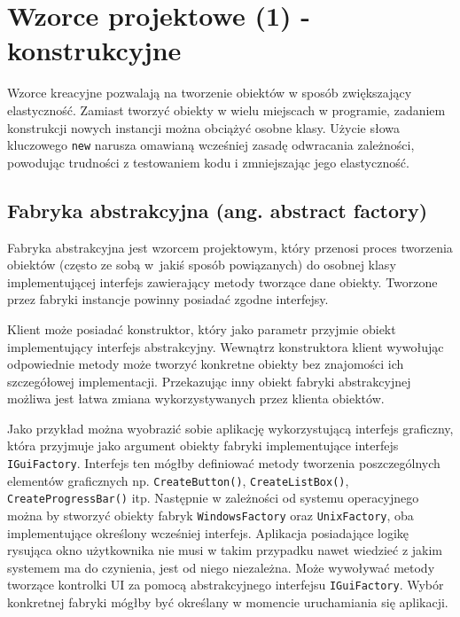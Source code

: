 \section{Wzorce projektowe (1) - konstrukcyjne}
Wzorce kreacyjne pozwalają na tworzenie obiektów w sposób zwiększający elastyczność. Zamiast tworzyć obiekty w wielu miejscach w programie, zadaniem konstrukcji nowych instancji można obciążyć osobne klasy. Użycie słowa kluczowego \texttt{new} narusza omawianą wcześniej zasadę odwracania zależności, powodując trudności z testowaniem kodu i zmniejszając jego elastyczność. 

\subsection{Fabryka abstrakcyjna (ang. abstract factory)}\label{sec/lab2/abstractFactory}
Fabryka abstrakcyjna jest wzorcem projektowym, który przenosi proces tworzenia obiektów (często ze sobą w~jakiś sposób powiązanych) do osobnej klasy implementującej interfejs zawierający metody tworzące dane obiekty. Tworzone przez fabryki instancje powinny posiadać zgodne interfejsy.

Klient może posiadać konstruktor, który jako parametr przyjmie obiekt implementujący interfejs abstrakcyjny. Wewnątrz konstruktora klient wywołując odpowiednie metody może tworzyć konkretne obiekty bez znajomości ich szczegółowej implementacji. Przekazując inny obiekt fabryki abstrakcyjnej możliwa jest łatwa zmiana wykorzystywanych przez klienta obiektów.

Jako przykład można wyobrazić sobie aplikację wykorzystującą interfejs graficzny, która przyjmuje jako argument obiekty fabryki implementujące interfejs \texttt{IGuiFactory}. Interfejs ten mógłby definiować metody tworzenia poszczególnych elementów graficznych np. \texttt{CreateButton()}, \texttt{CreateListBox()}, \texttt{CreateProgressBar()} itp. Następnie w zależności od systemu operacyjnego można by stworzyć obiekty fabryk \texttt{WindowsFactory} oraz \texttt{UnixFactory}, oba implementujące określony wcześniej interfejs. Aplikacja posiadające logikę rysująca okno użytkownika nie musi w takim przypadku nawet wiedzieć z jakim systemem ma do czynienia, jest od niego niezależna. Może wywoływać metody tworzące kontrolki UI za pomocą abstrakcyjnego interfejsu \texttt{IGuiFactory}. Wybór konkretnej fabryki mógłby być określany w momencie uruchamiania się aplikacji.

